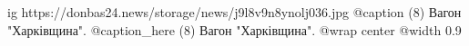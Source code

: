  
 
 
 
 

\ifcmt
  ig https://donbas24.news/storage/news/j9l8v9n8ynolj036.jpg
	@caption (8) Вагон "Харківщина".
	@caption_here (8) Вагон "Харківщина".
  @wrap center
  @width 0.9
\fi
